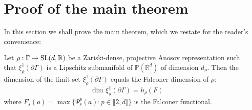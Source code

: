 \documentclass{report}
\begin{document}
\section{Proof of the main theorem}\label{sec:main_thm_proof}
In this section we shall prove the main theorem, which we restate for the reader's convenience:
\begin{theorem}\label{thm:main}
    Let $\rho: \Gamma \to \operatorname{{\mathrm{SL}}}(d, \mathbb R)$ be a Zariski-dense, projective Anosov representation such that $\xi^1_\rho(\partial \Gamma)$ is a Lipschitz submanifold of $\mathbb P(\mathbb R^d)$ of dimension $d_\rho$.
    Then the dimension of the limit set $\xi_\rho^1(\partial \Gamma)$ equals the Falconer dimension of $\rho$:
    \[
        \dim \xi_\rho^1(\partial \Gamma) = h_\rho(F)
    \]
    where $F_s(a) = \max \{ \Psi_s^p(a) : p \in \llbracket 2, d \rrbracket\}$ is the Falconer functional.
\end{theorem}
\end{document}
